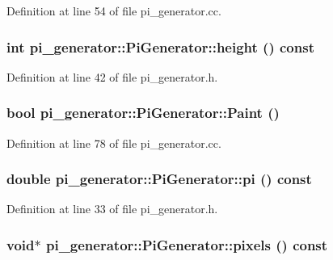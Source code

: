 Definition at line 54 of file pi\_\-generator.cc.

\hypertarget{classpi__generator_1_1_pi_generator_a7cdc6f6c02a01a63e813c8357e901fb9}{
\subsubsection[{height}]{\setlength{\rightskip}{0pt plus 5cm}int pi\_\-generator::PiGenerator::height () const}}
\label{classpi__generator_1_1_pi_generator_a7cdc6f6c02a01a63e813c8357e901fb9}


Definition at line 42 of file pi\_\-generator.h.

\hypertarget{classpi__generator_1_1_pi_generator_a47540afa1d21ef0b6e6ea7d986b71243}{
\subsubsection[{Paint}]{\setlength{\rightskip}{0pt plus 5cm}bool pi\_\-generator::PiGenerator::Paint ()}}
\label{classpi__generator_1_1_pi_generator_a47540afa1d21ef0b6e6ea7d986b71243}


Definition at line 78 of file pi\_\-generator.cc.

\hypertarget{classpi__generator_1_1_pi_generator_a74119d27c1a01b50b91677f8089a0103}{
\subsubsection[{pi}]{\setlength{\rightskip}{0pt plus 5cm}double pi\_\-generator::PiGenerator::pi () const}}
\label{classpi__generator_1_1_pi_generator_a74119d27c1a01b50b91677f8089a0103}


Definition at line 33 of file pi\_\-generator.h.

\hypertarget{classpi__generator_1_1_pi_generator_a3e4279bb7732861b21ab6d1dcfc27429}{
\subsubsection[{pixels}]{\setlength{\rightskip}{0pt plus 5cm}void$\ast$ pi\_\-generator::PiGenerator::pixels () const}}
\label{classpi__generator_1_1_pi_generator_a3e4279bb7732861b21ab6d1dcfc27429}


